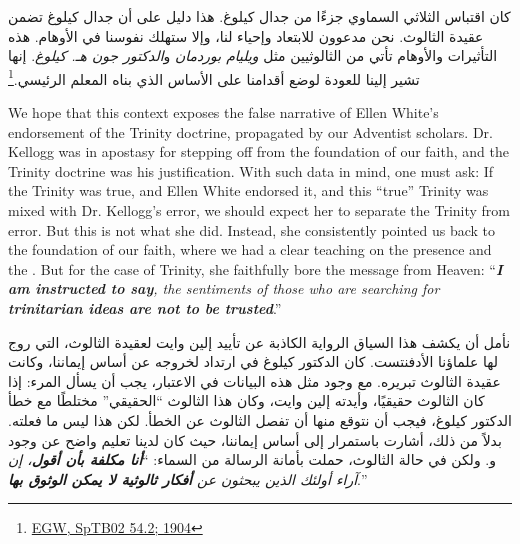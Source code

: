 كان اقتباس الثلاثي السماوي جزءًا من جدال كيلوغ. هذا دليل على أن جدال كيلوغ تضمن عقيدة الثالوث. نحن مدعوون للابتعاد  وإحياء  لنا، وإلا ستهلك نفوسنا في الأوهام. هذه التأثيرات والأوهام تأتي من الثالوثيين مثل \textit{ويليام بوردمان} و\textit{الدكتور جون هـ. كيلوغ}. إنها تشير إلينا للعودة لوضع أقدامنا على الأساس الذي بناه المعلم الرئيسي.\footnote{\href{https://egwwritings.org/?ref=en_SpTB02.54.2&para=417.276}{EGW, SpTB02 54.2; 1904}}


We hope that this context exposes the false narrative of Ellen White's endorsement of the Trinity doctrine, propagated by our Adventist scholars. Dr. Kellogg was in apostasy for stepping off from the foundation of our faith, and the Trinity doctrine was his justification. With such data in mind, one must ask: If the Trinity was true, and Ellen White endorsed it, and this “true” Trinity was mixed with Dr. Kellogg's error, we should expect her to separate the Trinity from error. But this is not what she did. Instead, she consistently pointed us back to the foundation of our faith, where we had a clear teaching on the presence and the . But for the case of Trinity, she faithfully bore the message from Heaven: “\textit{\textbf{I am instructed to say}, the sentiments of those who are searching for \textbf{trinitarian ideas are not to be trusted}}.”


نأمل أن يكشف هذا السياق الرواية الكاذبة عن تأييد إلين وايت لعقيدة الثالوث، التي روج لها علماؤنا الأدفنتست. كان الدكتور كيلوغ في ارتداد لخروجه عن أساس إيماننا، وكانت عقيدة الثالوث تبريره. مع وجود مثل هذه البيانات في الاعتبار، يجب أن يسأل المرء: إذا كان الثالوث حقيقيًا، وأيدته إلين وايت، وكان هذا الثالوث “الحقيقي” مختلطًا مع خطأ الدكتور كيلوغ، فيجب أن نتوقع منها أن تفصل الثالوث عن الخطأ. لكن هذا ليس ما فعلته. بدلاً من ذلك، أشارت باستمرار إلى أساس إيماننا، حيث كان لدينا تعليم واضح عن وجود و. ولكن في حالة الثالوث، حملت بأمانة الرسالة من السماء: “\textit{\textbf{أنا مكلفة بأن أقول}، إن آراء أولئك الذين يبحثون عن \textbf{أفكار ثالوثية لا يمكن الوثوق بها}}.”


